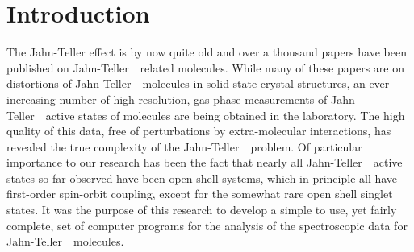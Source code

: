 \documentclass{article}
\newcommand{\JT}{Jahn-Teller\ }
\newcommand{\socjt}{{\bf SOCJT}}
\newcommand{\socrt}{{\bf SOCRT}}
\newcommand{\etoe}{{\bf e2e}}
\begin{document}
\begin{comment}
The following files are included in the distribution file {\tt
  socjt.zip}: 
\begin{description}
\item[{\tt socjt.exe}] Executable file for the main program,
  \socjt, to be run from a MS-DOS prompt.
\item[{\tt socrt.exe}] Executable file for the Renner-Teller
  version, \socrt .
\item[{\tt e2e.exe}] Executable file for the calculation of
  electronic transition intensities from one \JT\ active state to
  another.
\item[{\tt pi2pi.exe}] Executable file for the calculation of
  electronic transition intensities from one Renner-Teller active
  state to another. This file is not yet available.
\item[{\tt inputasst.exe}] Executable file that creates an input
  file for {\tt socjt.exe } based on the answers to a series of
  questions.
\item[{\tt test1}] Plain text input file to test \socjt.
\item[{\tt test2}] Plain text input file to test \socjt. The output
  of the files {\tt test1} and {\tt test2} can be used as input for
  \etoe .
\item[{\tt rt\_test}] Plain text input file to test \socrt .
\item[{\tt e2e\_test}] Plain text input file to test \etoe .
\item[{\tt manual.tex, manual.ps, and manual.pdf}] The users guide for
  the suite of programs. 
\item[{\tt output.zip}] All of the output files that are generated by
  running the test files. 
\end{description}
\end{comment}

\newpage

\section{Introduction} \label{section:intro}

The Jahn-Teller effect is by now quite old and over a thousand papers
have been published on \JT\ related molecules.  While many of these
papers are on distortions of \JT\ molecules in solid-state crystal
structures, an ever increasing number of high resolution, gas-phase
measurements of \JT\ active states of molecules are being obtained in
the laboratory. The high quality of this data, free of perturbations
by extra-molecular interactions, has revealed the true complexity of
the \JT\ problem. Of particular importance to our research has been
the fact that nearly all \JT\ active states so far observed have been
open shell systems, which in principle all have first-order
spin-orbit coupling, except for the somewhat rare open shell singlet
states. It was the purpose of this research to develop a simple
to use, yet fairly complete, set of computer programs for the analysis of the
spectroscopic data for \JT\ molecules.
\end{document}
